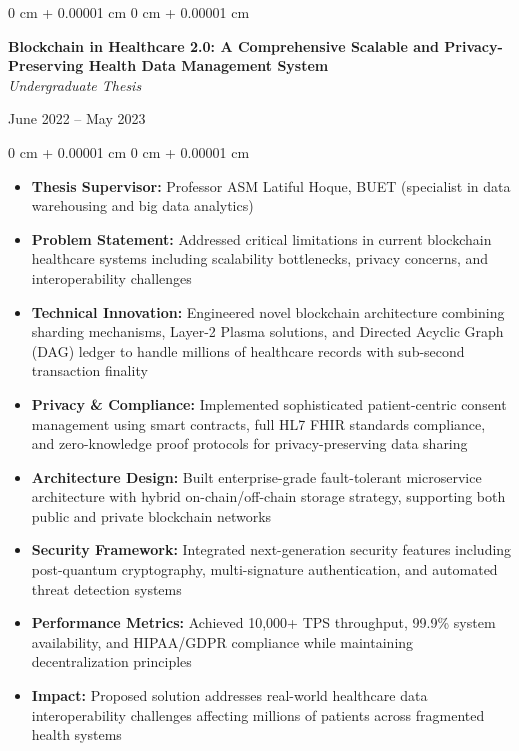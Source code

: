 \documentclass[10pt, letterpaper]{article}
\newenvironment{highlights}{
    \begin{itemize}[
        topsep=0.10 cm,
        parsep=0.10 cm,
        partopsep=0pt,
        itemsep=0pt,
        leftmargin=0 cm + 10pt
    ]
}{
    \end{itemize}
} %
\newenvironment{onecolentry}{
    \begin{adjustwidth}{
        0 cm + 0.00001 cm
    }{
        0 cm + 0.00001 cm
    }
}{
    \end{adjustwidth}
} %
\newenvironment{twocolentry}[2][]{
    \onecolentry
    \def\secondColumn{#2}
    \setcolumnwidth{\fill, 4.5 cm}
    \begin{paracol}{2}
}{
    \switchcolumn \raggedleft \secondColumn
    \end{paracol}
    \endonecolentry
} %
\begin{document}
\begin{twocolentry}{
    {June 2022 – May 2023}
}
    \textbf{Blockchain in Healthcare 2.0: A Comprehensive Scalable and Privacy-Preserving Health Data Management System} \\
    \textit{Undergraduate Thesis}
\end{twocolentry}

\begin{onecolentry}
    \begin{highlights}
        \item \textbf{Thesis Supervisor:} Professor ASM Latiful Hoque, BUET (specialist in data warehousing and big data analytics)
        \item \textbf{Problem Statement:} Addressed critical limitations in current blockchain healthcare systems including scalability bottlenecks, privacy concerns, and interoperability challenges
        \item \textbf{Technical Innovation:} Engineered novel blockchain architecture combining sharding mechanisms, Layer-2 Plasma solutions, and Directed Acyclic Graph (DAG) ledger to handle millions of healthcare records with sub-second transaction finality
        \item \textbf{Privacy \& Compliance:} Implemented sophisticated patient-centric consent management using smart contracts, full HL7 FHIR standards compliance, and zero-knowledge proof protocols for privacy-preserving data sharing
        \item \textbf{Architecture Design:} Built enterprise-grade fault-tolerant microservice architecture with hybrid on-chain/off-chain storage strategy, supporting both public and private blockchain networks
        \item \textbf{Security Framework:} Integrated next-generation security features including post-quantum cryptography, multi-signature authentication, and automated threat detection systems
        \item \textbf{Performance Metrics:} Achieved 10,000+ TPS throughput, 99.9\% system availability, and HIPAA/GDPR compliance while maintaining decentralization principles
        \item \textbf{Impact:} Proposed solution addresses real-world healthcare data interoperability challenges affecting millions of patients across fragmented health systems
    \end{highlights}
\end{onecolentry}
\end{document}
